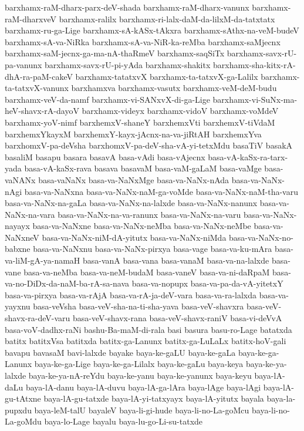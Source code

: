 {barxhamx-raM-dharx-parx-deV-shada
barxhamx-raM-dharx-vanunx
barxhamx-raM-dharxveV
barxhamx-ralilx
barxhamx-ri-lalx-daM-da-lilxM-da-tatxtatx
barxhamx-ru-ga-Lige
barxhamx-sA-kASx-tAkxra
barxhamx-sAthx-na-veM-budeV
barxhamx-sA-va-NiRka
barxhamx-sA-va-NiR-ka-reMba
barxhamx-saMjecnx
barxhamx-saM-jecnx-ga-ma-nA-thaRmeV
barxhamx-saqSiTx
barxhamx-savx-rU-pa-vanunx
barxhamx-savx-rU-pi-yAda
barxhamx-shakitx
barxhamx-sha-kitx-rA-dhA-ra-paM-cakeV
barxhamx-tatatxvX
barxhamx-ta-tatxvX-ga-Lalilx
barxhamx-ta-tatxvX-vanunx
barxhamxva
barxhamx-vasutx
barxhamx-veM-deM-budu
barxhamx-veV-da-namf
barxhamx-vi-SANxvX-di-ga-Lige
barxhamx-vi-SuNx-ma-heV-shavx-rA-dayoV
barxhamx-videyx
barxhamx-vidoV
barxhamx-voMdeV
barxhamx-yoV-nimf
barxhemxV-shaneY
barxhemxVti
barxhemxV-tiVdaM
barxhemxYkayxM
barxhemxY-kayx-jAcnx-na-va-jiRtAH
barxhemxYva
barxhomxV-pa-deVsha
barxhomxV-pa-deV-sha-vA-yi-tetxMdu
basaTiV
basakA
basaliM
basapu
basara
basavA
basa-vAdi
basa-vAjecnx
basa-vA-kaSx-ra-tarx-yada
basa-vA-kaSx-rava
basava
basavaM
basa-vaM-gaLaM
basa-vaMge
basa-vaNANx
basa-vaNaNx
basa-va-NaNxMge
basa-va-NaNx-nAda
basa-va-NaNx-nAgi
basa-va-NaNxna
basa-va-NaNx-naM-ga-voMde
basa-va-NaNx-naM-tha-varu
basa-va-NaNx-na-gaLa
basa-va-NaNx-na-lalxde
basa-va-NaNx-nanunx
basa-va-NaNx-na-vara
basa-va-NaNx-na-va-ranunx
basa-va-NaNx-na-varu
basa-va-NaNx-nayayx
basa-va-NaNxne
basa-va-NaNx-neMba
basa-va-NaNx-neMbe
basa-va-NaNxneV
basa-va-NaNx-niM-dA-yitutx
basa-va-NaNx-niMda
basa-va-NaNx-no-babxne
basa-va-NaNxnu
basa-va-NaNx-pirxya
basa-vage
basa-va-ku-mAra
basa-va-liM-gA-ya-namaH
basa-vanA
basa-vana
basa-vanaM
basa-va-na-lalxde
basa-vane
basa-va-neMba
basa-va-neM-budaM
basa-vaneV
basa-va-ni-daRpaM
basa-va-no-DiDx-da-naM-ba-rA-sa-nava
basa-va-nopupx
basa-va-pa-da-vA-yitetxY
basa-va-pirxya
basa-va-rAjA
basa-va-rA-ja-deV-vara
basa-va-ra-lalxda
basa-va-yayxnu
basa-veVsha
basa-veV-sha-na-ti-sha-yava
basa-veV-shavxra
basa-veV-shavx-ra-deV-varu
basa-veV-shavx-rana
basa-veV-shavx-raniV
basa-vi-deVvA
basa-voV-dadhx-raNi
bashu-Ba-maM-di-rala
basi
basura
basu-ro-Lage
batatxda
batitx
batitxVsa
batitxda
batitx-ga-Lanunx
batitx-ga-LuLaLx
batitx-hoV-gali
bavapu
bavasaM
bavi-lalxde
bayake
baya-ke-gaLU
baya-ke-gaLa
baya-ke-ga-Lanunx
baya-ke-ga-Lige
baya-ke-ga-Lilalx
baya-ke-gaLu
baya-keya
baya-ke-ya-lalxde
baya-ke-ya-nA-reYdu
baya-ke-yanu
baya-ke-yanunx
baya-keyu
baya-lA-daLu
baya-lA-danu
baya-lA-duvu
baya-lA-ga-lAra
baya-lAge
baya-lAgi
baya-lA-gu-tAtxne
baya-lA-gu-tatxde
baya-lA-yi-tatxyayx
baya-lA-yitutx
bayala
baya-la-pupxdu
baya-leM-talU
bayaleV
baya-li-gi-hude
baya-li-no-La-goMcu
baya-li-no-La-goMdu
baya-lo-Lage
bayalu
baya-lu-go-Li-su-tatxde
}
